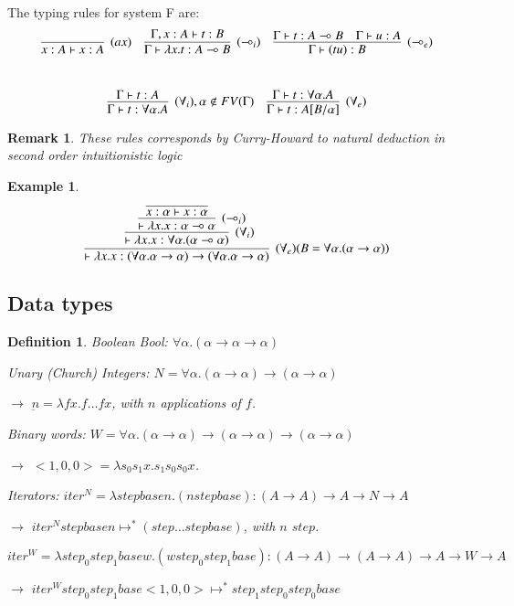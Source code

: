 \documentclass[a4paper,10pt]{article}
\newcommand{\impl}{\rightarrow}	%
\newcommand{\limpl}{\multimap}  %
\newtheorem{definition}{Definition}
\newtheorem{ex}{Example}
\newtheorem{rmk}{Remark}
\begin{document}
\par The typing rules for system F are:
$$	\infer[(ax)]{x:A \vdash x:A}{} \quad
	\infer[(\limpl_i)]{\Gamma \vdash \lambda x.t : A \limpl B}{\Gamma, x:A \vdash t:B} \quad
	\infer[(\limpl_e)]{\Gamma \vdash (t u) : B}{\Gamma \vdash t : A \limpl B & \Gamma \vdash u : A }$$ \\
$$	\infer[(\forall_i), \alpha \notin FV(\Gamma)]{\Gamma \vdash t:\forall \alpha.A}{\Gamma \vdash t:A} \quad
	\infer[(\forall_e)]{\Gamma \vdash t:A[B/\alpha]}{\Gamma \vdash t:\forall \alpha.A}
$$

\begin{rmk}
These rules corresponds by Curry-Howard to natural deduction in second order intuitionistic logic
\end{rmk}

\begin{ex}
$$ \infer[(\forall_e) (B=\forall \alpha.(\alpha \impl \alpha))]{\vdash \lambda x. x: (\forall \alpha. \alpha \impl \alpha) \impl (\forall \alpha. \alpha \impl \alpha)}
	{
	\infer[(\forall_i)]{\vdash \lambda x.x : \forall \alpha.(\alpha \limpl \alpha)}
		{
		\infer[(\limpl_i)]{\vdash \lambda x.x : \alpha \limpl \alpha}
			{
				\infer{x:\alpha \vdash x:\alpha}{}
			}
		}
	}$$
\end{ex}



\subsection{Data types}

\begin{definition}
\item Boolean Bool: $\forall \alpha.(\alpha \impl \alpha \impl \alpha)$
\item Unary (Church) Integers: $N = \forall \alpha.(\alpha \impl \alpha) \impl (\alpha \impl \alpha)$
\item[$\rightarrow$] $\underbar{n} = \lambda f x. f\dots f x$, with $n$ applications of $f$.
\item Binary words: $W = \forall \alpha.(\alpha \impl \alpha) \impl (\alpha \impl \alpha) \impl (\alpha \impl \alpha)$
\item[$\rightarrow$] $<1,0,0> = \lambda s_0 s_1 x. s_1 s_0 s_0 x$.
\vspace{0.2cm}

\item Iterators: $iter^{N} = \lambda step base n. (n step base) : (A \impl A) \impl A \impl N \impl A$
\item[$\rightarrow$] $iter^{N} step base n \mapsto^{*} (step \dots step base)$, with $n$ $step$.
\item $iter^{W} = \lambda step_0 step_1 base w. (w step_0 step_1 base) : (A \impl A) \impl (A \impl A) \impl A \impl W \impl A$
\item[$\rightarrow$] $iter^{W} step_0 step_1 base <1,0,0> \mapsto^{*} step_1 step_0 step_0 base$
\end{definition}
\end{document}
